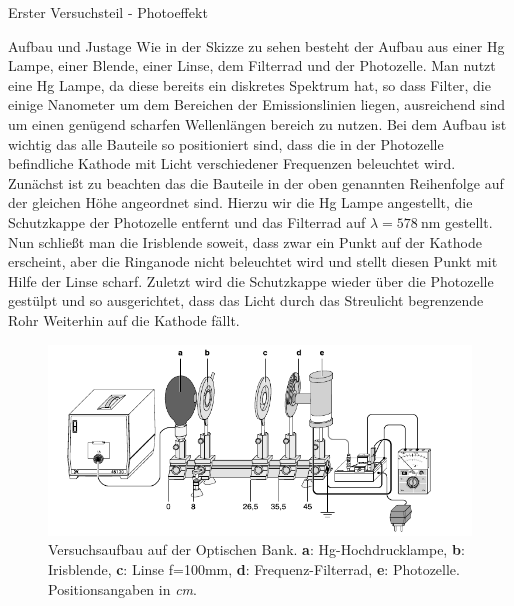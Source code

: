 \documentclass[pdftex, a4paper,11pt, twoside, ngerman]{report}
\begin{document}
  \begin{chapter}{Erster Versuchsteil - Photoeffekt}
    \label{chp:Photoeffekt}
    
    
    
    \begin{section}{Aufbau und Justage}
      \label{chp:photoeffekt:sec:AufbauJustage}
      Wie in der Skizze zu sehen besteht der Aufbau aus einer Hg Lampe, einer Blende, einer Linse, dem Filterrad und der Photozelle. Man nutzt eine Hg Lampe, da diese bereits ein diskretes Spektrum hat, so dass Filter, die einige Nanometer um dem Bereichen der Emissionslinien liegen, ausreichend sind um einen genügend scharfen Wellenlängen bereich zu nutzen. Bei dem Aufbau ist wichtig das alle Bauteile so positioniert sind, dass die in der Photozelle befindliche Kathode mit Licht verschiedener Frequenzen beleuchtet wird. Zunächst ist zu beachten das die Bauteile in der oben genannten Reihenfolge auf der gleichen Höhe angeordnet sind. Hierzu wir die Hg Lampe angestellt, die Schutzkappe der Photozelle entfernt und das Filterrad auf $\lambda = \SI{578}{\nano\meter}$ gestellt. Nun schließt man die Irisblende soweit, dass zwar ein Punkt auf der Kathode erscheint, aber die Ringanode nicht beleuchtet wird und stellt diesen Punkt mit Hilfe der Linse scharf. Zuletzt wird die Schutzkappe wieder über die Photozelle gestülpt und so ausgerichtet, dass das Licht durch das Streulicht begrenzende Rohr Weiterhin auf die Kathode fällt.
      \begin{figure}[htbp]
        \begin{center}
          \includegraphics[width=.9\textwidth]{Figures/Planckaufbau.png}
          \caption{Versuchsaufbau auf der Optischen Bank. \textbf{a}: Hg-Hochdrucklampe, \textbf{b}: Irisblende,  \textbf{c}: Linse f=100mm, \textbf{d}: Frequenz-Filterrad, \textbf{e}: Photozelle. Positionsangaben in \textit{cm}. \cite{bib:LDDidactic}}\label{fig:Planckaufbau}

\end{center}
\end{figure}
\end{section}
\end{chapter}
\end{document}
